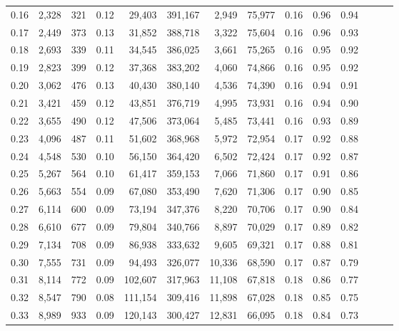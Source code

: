 \begin{tabular}{rrrrrrrrrrrrrr}
0.16 &   2,328 &    321 &  0.12 &   29,403 &  391,167 &   2,949 &  75,977 &  0.16 &  0.96 &      0.94 \\
0.17 &   2,449 &    373 &  0.13 &   31,852 &  388,718 &   3,322 &  75,604 &  0.16 &  0.96 &      0.93 \\
0.18 &   2,693 &    339 &  0.11 &   34,545 &  386,025 &   3,661 &  75,265 &  0.16 &  0.95 &      0.92 \\
0.19 &   2,823 &    399 &  0.12 &   37,368 &  383,202 &   4,060 &  74,866 &  0.16 &  0.95 &      0.92 \\
0.20 &   3,062 &    476 &  0.13 &   40,430 &  380,140 &   4,536 &  74,390 &  0.16 &  0.94 &      0.91 \\
0.21 &   3,421 &    459 &  0.12 &   43,851 &  376,719 &   4,995 &  73,931 &  0.16 &  0.94 &      0.90 \\
0.22 &   3,655 &    490 &  0.12 &   47,506 &  373,064 &   5,485 &  73,441 &  0.16 &  0.93 &      0.89 \\
0.23 &   4,096 &    487 &  0.11 &   51,602 &  368,968 &   5,972 &  72,954 &  0.17 &  0.92 &      0.88 \\
0.24 &   4,548 &    530 &  0.10 &   56,150 &  364,420 &   6,502 &  72,424 &  0.17 &  0.92 &      0.87 \\
0.25 &   5,267 &    564 &  0.10 &   61,417 &  359,153 &   7,066 &  71,860 &  0.17 &  0.91 &      0.86 \\
0.26 &   5,663 &    554 &  0.09 &   67,080 &  353,490 &   7,620 &  71,306 &  0.17 &  0.90 &      0.85 \\
0.27 &   6,114 &    600 &  0.09 &   73,194 &  347,376 &   8,220 &  70,706 &  0.17 &  0.90 &      0.84 \\
0.28 &   6,610 &    677 &  0.09 &   79,804 &  340,766 &   8,897 &  70,029 &  0.17 &  0.89 &      0.82 \\
0.29 &   7,134 &    708 &  0.09 &   86,938 &  333,632 &   9,605 &  69,321 &  0.17 &  0.88 &      0.81 \\
0.30 &   7,555 &    731 &  0.09 &   94,493 &  326,077 &  10,336 &  68,590 &  0.17 &  0.87 &      0.79 \\
0.31 &   8,114 &    772 &  0.09 &  102,607 &  317,963 &  11,108 &  67,818 &  0.18 &  0.86 &      0.77 \\
0.32 &   8,547 &    790 &  0.08 &  111,154 &  309,416 &  11,898 &  67,028 &  0.18 &  0.85 &      0.75 \\
0.33 &   8,989 &    933 &  0.09 &  120,143 &  300,427 &  12,831 &  66,095 &  0.18 &  0.84 &      0.73 \\

\end{tabular}
